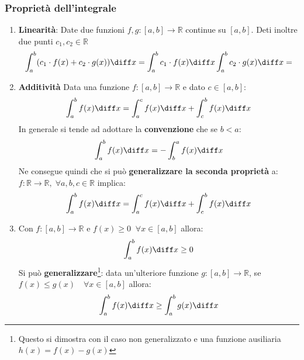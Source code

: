 \subsubsection{Proprietà dell'integrale}
\begin{enumerate}
	\item \textbf{Linearità}: Date due funzioni $f,g:[a,b] \to \mathbb{R}$ 
        continue su $[a,b]$. Deti inoltre due punti $c_1, c_2 \in \mathbb{R}$
		\begin{equation*}
			\int_a^b (c_1 \cdot f(x) + c_2 \cdot g(x)) \diff x = \int_a^b c_1 
            \cdot f(x) \diff x \int_a^b c_2 \cdot g(x) \diff x = 
		\end{equation*}

	\item \textbf{Additività} Data una funzione $f:[a,b] \to \mathbb{R}$ e dato 
        $c \in [a,b]$:
		\begin{equation*}
			\int_a^b f(x) \diff x = \int_a^c f(x) \diff x + \int_c^b f(x) 
            \diff x
		\end{equation*}
		In generale si tende ad adottare la \textbf{convenzione} che se 
        $b < a$:
		\begin{equation*}
			\int_a^b f(x) \diff x = -\int_b^a f(x) \diff x
		\end{equation*}
		Ne consegue quindi che si può \textbf{generalizzare la seconda 
        proprietà} a: $f:\mathbb{R} \to \mathbb{R},\; \forall a,b,c \in 
        \mathbb{R}$ implica:
		\begin{equation*}
			\int_a^b f(x) \diff x = \int_a^c f(x) \diff x + \int_c^b f(x) 
            \diff x 
		\end{equation*}

	\item Con $f:[a,b] \to \mathbb{R}$ e $f(x) \geq 0 \;\; \forall x \in [a,b]$ 
        allora:
		\begin{equation*}
			\int_a^b f(x) \diff x \geq 0
		\end{equation*}
		Si può \textbf{generalizzare}\footnote{Questo si dimostra con il caso 
        non generalizzato e una funzione ausiliaria $h(x) = f(x) - g(x)$}: data 
        un'ulteriore funzione $g:[a,b] \to \mathbb{R}$, se $f(x) \leq g(x) 
        \quad \forall x \in [a,b]$ allora:
		\begin{equation*}
			\int_a^b f(x) \diff x \geq \int_a^b g(x) \diff x
		\end{equation*}
\end{enumerate}

